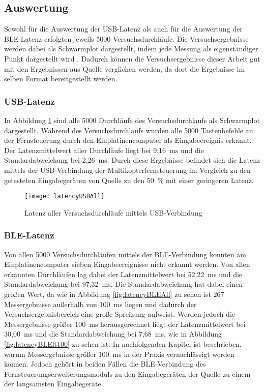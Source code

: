 \subsection{Auswertung}
Sowohl für die Auswertung der USB-Latenz als auch für die Auswertung der \ac{BLE}-Latenz erfolgten jeweils 5000 Versuchsdurchläufe. Die Versuchsergebnisse werden dabei als Schwarmplot dargestellt, indem jede Messung als eigenständiger Punkt dargestellt wird \cite[S.~7]{wimmerLatenzStation}. Dadurch können die Versuchsergebnisse dieser Arbeit gut mit den Ergebnissen aus Quelle \cite{wimmerLatenzStation} verglichen werden, da dort die Ergebnisse im selben Format bereitgestellt werden. 

\subsubsection{USB-Latenz}
In Abbildung \ref{fig:latencyUSBAll} sind alle 5000 Durchläufe des Versuchsdurchlaufs als Schwarmplot dargestellt. Während des Versuchsdurchlaufs wurden alle 5000 Tastenbefehle an der Fernsteuerung durch den Einplatinencomputer als Eingabeereignis erkannt. Der Latenzmittelwert aller Durchläufe liegt bei 9,16~ms und die Standardabweichung bei 2,26~ms. Durch diese Ergebnisse befindet sich die Latenz mittels der USB-Verbindung der Multikopterfernsteuerung im Vergleich zu den getesteten Eingabegeräten von Quelle \cite{wimmerLatenzStation} zu den 50~\% mit einer geringeren Latenz.

\begin{figure}[H]
    \centering
    \texttt{[image: latencyUSBAll]}
    \caption{Latenz aller Versuchsdurchläufe mittels USB-Verbindung}
    \label{fig:latencyUSBAll}
\end{figure}

\subsubsection{\ac{BLE}-Latenz}
Von allen 5000 Versuchsdurchläufen mittels der \ac{BLE}-Verbindung konnten am Einplatinencomputer sieben Eingabeereignisse nicht erkannt werden. Von allen erkannten Durchläufen lag dabei der Latenzmittelwert bei 52,22~ms und die Standardabweichung bei 97,32~ms. Die Standardabweichung hat dabei einen großen Wert, da wie in Abbildung \ref{fig:latencyBLEAll} zu sehen ist 267 Messergebnisse außerhalb von 100~ms liegen und dadurch der Versuchsergebnisbereich eine große Spreizung aufweist. Werden jedoch die Messergebnisse größer 100~ms herausgerechnet liegt der Latenzmittelwert bei 30,00~ms und die Standardabweichung bei 7,68~ms, wie in Abbildung \ref{fig:latencyBLElt100} zu sehen ist. In nachfolgenden Kapitel ist beschrieben, warum Messergebnisse größer 100~ms in der Praxis vernachlässigt werden können. Jedoch gehört in beiden Fällen die \ac{BLE}-Verbindung des Fernsteuerungserweiterungsmoduls zu den Eingabegeräten der Quelle \cite{wimmerLatenzStation} zu einem der langsamsten Eingabegeräte.


